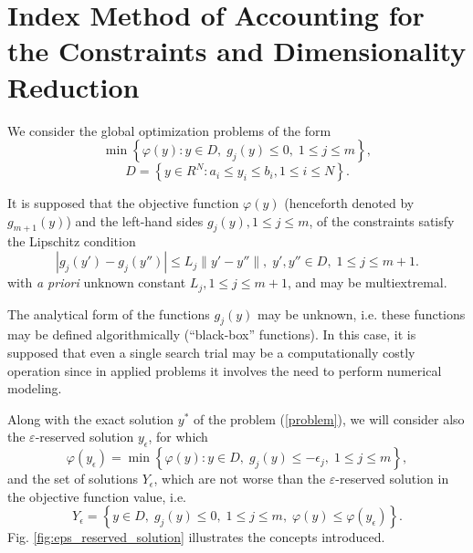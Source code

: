 \documentclass[review]{elsarticle}
\begin{document}
\section{Index Method of Accounting for the Constraints and Dimensionality Reduction}
	We consider the global optimization problems of the form
\begin{equation}\label{problem}
	\min{\left\{\varphi(y):y \in D, \; g_j(y)\leq 0, \; 1 \leq j \leq m\right\}},
\end{equation}
\begin{equation}\label{D}
	D=\left\{y\in R^N: a_i\leq y_i \leq b_i, 1\leq i \leq N\right\}.
\end{equation}

	It is supposed that the objective function $\varphi(y)$ (henceforth denoted by $g_{m+1}(y)$) and the left-hand sides $g_{j}(y), 1 \leq j \leq m$, of the constraints satisfy the Lipschitz condition
\begin{equation}\label{lipschitz_condition}
	\left|g_j(y')-g_j (y'')\right| \leq L_j \|y'-y''\|, \; y', y''\in D, \; 1\leq j \leq m+1.
\end{equation}
with \textit{a priori} unknown constant $L_j, 1\leq j \leq m+1$, and may be multiextremal.

	The analytical form of the functions $g_{j}(y)$ may be unknown, i.e. these functions may be defined algorithmically (“black-box” functions). In this case, it is supposed that even a single search trial may be a computationally costly operation since in applied problems it involves the need to perform numerical modeling. 
	
	Along with the exact solution $y^\ast$ of the problem (\ref{problem}), we will consider also the $\varepsilon$-reserved solution $y_{\epsilon}$, for which 
\begin{equation}\label{epsilon_reserved_solution}
	\varphi(y_{\epsilon})=\min{\left\{\varphi(y):y \in D, \; g_j(y)\leq -{\epsilon}_j, \; 1 \leq j \leq m\right\}},
\end{equation}
and the set of solutions $Y_{\epsilon}$, which are not worse than the $\varepsilon$-reserved solution in the objective function value, i.e.
\begin{equation}\label{Y_epsilon}
	Y_{\epsilon}=\left\{ y \in D, \; g_j(y) \leq 0, \; 1 \leq j \leq m, \; \varphi(y) \leq \varphi(y_{\epsilon}) \right\}.
\end{equation}
Fig. \ref{fig:eps_reserved_solution} illustrates the concepts introduced.
\end{document}
